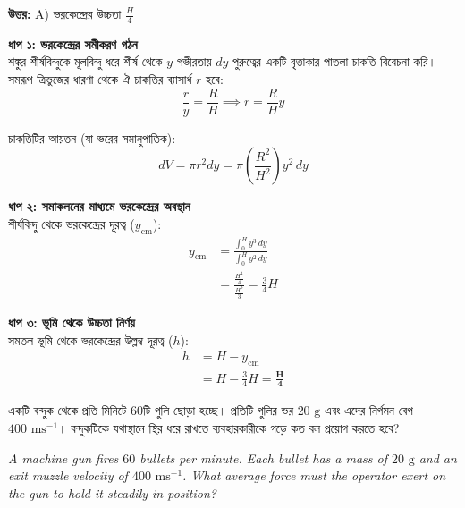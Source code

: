 \documentclass[12pt, a4paper]{article}
\begin{document}
\vspace{0.5em}
\begin{tcolorbox}[answerbox]
    \textbf{\color{success} উত্তর:} A) ভরকেন্দ্রের উচ্চতা $\frac{H}{4}$
\end{tcolorbox}
\vspace{1em}

\begin{tcolorbox}[solutionbox={সমাধান (Solution)}]
    \noindent
    \textbf{ধাপ ১: ভরকেন্দ্রের সমীকরণ গঠন} \\
    শঙ্কুর শীর্ষবিন্দুকে মূলবিন্দু ধরে শীর্ষ থেকে $y$ গভীরতায় $dy$ পুরুত্বের একটি বৃত্তাকার পাতলা চাকতি বিবেচনা করি। 
    সমরূপ ত্রিভুজের ধারণা থেকে ঐ চাকতির ব্যাসার্ধ $r$ হবে:
    \[ \frac{r}{y} = \frac{R}{H} \implies r = \frac{R}{H} y \]
    
    চাকতিটির আয়তন (যা ভরের সমানুপাতিক):
    \[ dV = \pi r^2 dy = \pi \left(\frac{R^2}{H^2}\right) y^2 \, dy \]
    
    \vspace{0.5em}
    \noindent\textbf{ধাপ ২: সমাকলনের মাধ্যমে ভরকেন্দ্রের অবস্থান} \\
    শীর্ষবিন্দু থেকে ভরকেন্দ্রের দূরত্ব ($y_{\text{cm}}$):
    \begin{align*}
        y_{\text{cm}} &= \frac{\int_0^H y^3 \, dy}{\int_0^H y^2 \, dy} \\
                      &= \frac{\frac{H^4}{4}}{\frac{H^3}{3}} = \frac{3}{4}H
    \end{align*}
    
    \vspace{0.5em}
    \noindent\textbf{ধাপ ৩: ভূমি থেকে উচ্চতা নির্ণয়} \\
    সমতল ভূমি থেকে ভরকেন্দ্রের উল্লম্ব দূরত্ব ($h$):
    \begin{align*}
        h &= H - y_{\text{cm}} \\
          &= H - \frac{3}{4}H = \mathbf{\frac{H}{4}}
    \end{align*}
\end{tcolorbox}

\newpage

\begin{tcolorbox}[questionbox={প্রশ্ন (Question) 33}]
    \noindent
    একটি বন্দুক থেকে প্রতি মিনিটে $60$টি গুলি ছোড়া হচ্ছে। প্রতিটি গুলির ভর $20\text{ g}$ এবং এদের নির্গমন বেগ $400\text{ ms}^{-1}$। বন্দুকটিকে যথাস্থানে স্থির ধরে রাখতে ব্যবহারকারীকে গড়ে কত বল প্রয়োগ করতে হবে?
    
    \vspace{0.8em}
    \begin{english}
    \noindent\textit{\color{darkgray}
    A machine gun fires $60$ bullets per minute. Each bullet has a mass of $20\text{ g}$ and an exit muzzle velocity of $400\text{ ms}^{-1}$. What average force must the operator exert on the gun to hold it steadily in position?
    }
    \end{english}
\end{tcolorbox}
\end{document}
